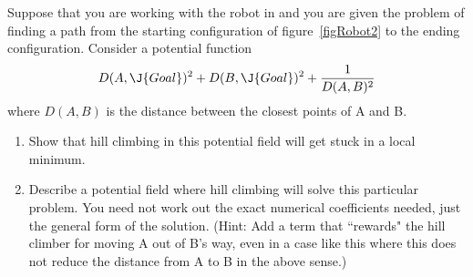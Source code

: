 \begin{uexercise}
Suppose that you are working with the robot in  and you are given
the problem of finding a path from the starting configuration of 
figure~\ref{figRobot2} to the ending configuration.  Consider a potential
function 
\[ D(A, \J{Goal})^2 + D(B, \J{Goal})^2 + \frac{1}{D(A, B)^2}
\]
where \(D(A,B)\) is the distance between the closest points of A and B.

\begin{enumerate} 
\item Show that hill climbing in this potential field will get
stuck in a local minimum.
\item Describe a potential field where hill climbing will solve this 
particular problem.  You need not work out the exact numerical coefficients 
needed, just the general form of the solution. (Hint: Add a term that ``rewards"
the hill climber for moving A out of B's way, even in a case like this where
this does not reduce the distance from A to B in the above sense.) 
\end{enumerate}
\end{uexercise} 


